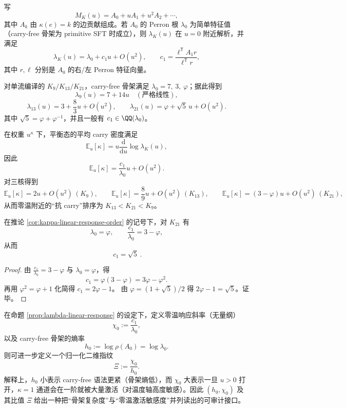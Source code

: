 \begin{proposition}[零温附近的线性响应不变量]\label{prop:lambda-linear-response}
写
\[
M_K(u)=A_0+uA_1+u^2A_2+\cdots,
\]
其中 $A_k$ 由 $\kappa(e)=k$ 的边贡献组成。若 $A_0$ 的 Perron 根 $\lambda_0$ 为简单特征值（carry-free 骨架为 primitive SFT 时成立），则 $\lambda_K(u)$ 在 $u=0$ 附近解析，并满足
\[
\lambda_K(u)=\lambda_0+c_1u+O(u^2),
\qquad
c_1=\frac{\ell^{\mathsf T}A_1 r}{\ell^{\mathsf T}r},
\]
其中 $r,\ell$ 分别是 $A_0$ 的右/左 Perron 特征向量。
\end{proposition}

\begin{corollary}[三核的精确一阶系数]\label{cor:lambda-linear-response-kernels}
对单流编译的 $K_9/K_{13}/K_{21}$，carry-free 骨架满足
\(
\lambda_0=7,\ 3,\ \varphi
\)；据此得到
\[
\lambda_{9}(u)=7+14u\quad(\text{严格线性}),
\]
\[
\lambda_{13}(u)=3+\frac{8}{3}u+O(u^2),
\qquad
\lambda_{21}(u)=\varphi+\sqrt5\,u+O(u^2).
\]
其中 $\sqrt5=\varphi+\varphi^{-1}$，并且一般有 $c_1\in\QQ(\lambda_0)$。
\end{corollary}

\begin{corollary}\label{cor:kappa-linear-response-order}
在权重 $u^{\kappa}$ 下，平衡态的平均 carry 密度满足
\[
\mathbb{E}_u[\kappa]=u\frac{\mathrm{d}}{\mathrm{d}u}\log\lambda_K(u),
\]
因此
\[
\mathbb{E}_u[\kappa]=\frac{c_1}{\lambda_0}u+O(u^2).
\]
对三核得到
\[
\mathbb{E}_u[\kappa]=2u+O(u^2)\ (K_9),\qquad
\mathbb{E}_u[\kappa]=\frac{8}{9}u+O(u^2)\ (K_{13}),\qquad
\mathbb{E}_u[\kappa]=(3-\varphi)u+O(u^2)\ (K_{21}),
\]
从而零温附近的“抗 carry”排序为 $K_{13}<K_{21}<K_{9}$。
\end{corollary}

\begin{corollary}\label{cor:k21-c1-sqrt5}
在推论 \ref{cor:kappa-linear-response-order} 的记号下，对 \(K_{21}\) 有
\[
\lambda_0=\varphi,\qquad \frac{c_1}{\lambda_0}=3-\varphi,
\]
从而
\[
\boxed{\ c_1=\sqrt5\ }.
\]
\end{corollary}
\begin{proof}
由 \(\frac{c_1}{\lambda_0}=3-\varphi\) 与 \(\lambda_0=\varphi\)，得
\[
c_1=\varphi(3-\varphi)=3\varphi-\varphi^2.
\]
再用 \(\varphi^2=\varphi+1\) 化简得
\(
c_1=2\varphi-1
\)。
由 \(\varphi=(1+\sqrt5)/2\) 得 \(2\varphi-1=\sqrt5\)。证毕。
\end{proof}

\begin{remark}\label{rem:zero-temp-two-scales}
在命题 \ref{prop:lambda-linear-response} 的设定下，定义零温响应斜率（无量纲）
$$
\chi_0:=\frac{c_1}{\lambda_0},
$$
以及 carry-free 骨架的熵率
$$
h_0:=\log\rho(A_0)=\log\lambda_0.
$$
则可进一步定义一个归一化二维指纹
$$
\Xi:=\frac{\chi_0}{h_0}.
$$
解释上，\(h_0\) 小表示 carry-free 语法更紧（骨架熵低），而 \(\chi_0\) 大表示一旦 \(u>0\) 打开，\(\kappa=1\) 通道会在一阶就被大量激活（对温度轴高度敏感）。因此 \((h_0,\chi_0)\) 及其比值 \(\Xi\) 给出一种把“骨架复杂度”与“零温激活敏感度”并列读出的可审计接口。
\end{remark}

